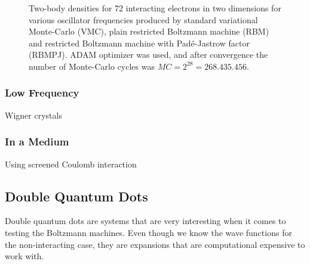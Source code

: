 \begin{landscape}
\begin{figure} [H]
		\caption{Two-body densities for 72 interacting electrons in two dimensions for various oscillator frequencies produced by standard variational Monte-Carlo (VMC), plain restricted Boltzmann machine (RBM) and restricted Boltzmann machine with Padé-Jastrow factor (RBMPJ). ADAM optimizer was used, and after convergence the number of Monte-Carlo cycles was $MC=2^{28}=268.435.456$.}%
		\label{fig:TB_interaction_3D_2}
	\end{figure}
\fi
\end{landscape}

\subsubsection{Low Frequency}
Wigner crystals

\subsubsection{In a Medium}
Using screened Coulomb interaction 

\subsection{Double Quantum Dots}
Double quantum dots are systems that are very interesting when it comes to testing the Boltzmann machines. Even though we know the wave functions for the non-interacting case, they are expansions that are computational expensive to work with.


